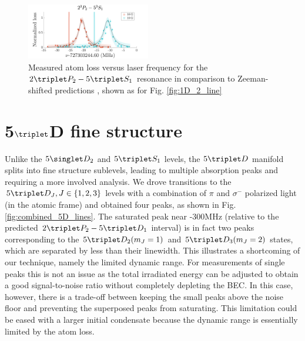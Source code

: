 \begin{figure}[t]
    \centering
    \includegraphics[width=0.48\textwidth]{fig/spectroscopy/ci-plot-53S1-eps-converted-to.pdf}
    \caption{Measured atom loss versus laser frequency for the $2\triplet P_2 - 5\triplet S_1$ resonance in comparison to Zeeman-shifted predictions \cite{Drake07}, shown as for Fig.
	\ref{fig:1D_2_line}}
    \label{fig:5_3S_1}
\end{figure}

\section{5$\triplet$D fine structure}

Unlike the $5\singlet D_2$ and $5\triplet S_1$ levels, the $5\triplet D$ manifold splits into fine structure sublevels, leading to multiple absorption peaks and requiring a more involved analysis.
	We drove transitions to the $5\triplet D_J, J\in\{1,2,3\}$ levels with a combination of $\pi$ and $\sigma^-$ polarized light (in the atomic frame) and obtained four peaks, as shown in Fig.
	\ref{fig:combined_5D_lines}.
	The saturated peak near -300MHz (relative to the predicted $2\triplet P_2 - 5\triplet D_1$ interval) is in fact two peaks corresponding to the $5\triplet D_2(m_J=1)$ and $5\triplet D_3(m_J=2)$ states, which are separated by less than their linewidth.
	This illustrates a shortcoming of our technique, namely the limited dynamic range.
	For measurements of single peaks this is not an issue as the total irradiated energy can be adjusted to obtain a good signal-to-noise ratio without completely depleting the BEC.
	In this case, however, there is a trade-off between keeping the small peaks above the noise floor and preventing the superposed peaks from saturating.
	This limitation could be eased with a larger initial condensate because the dynamic range is essentially limited by the atom loss.

